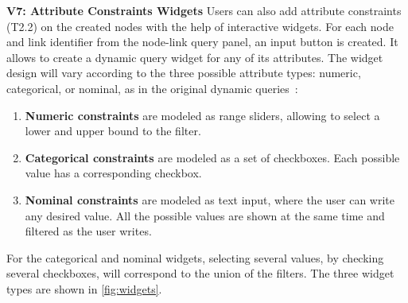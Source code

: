 \noindent\textbf{V7: Attribute Constraints Widgets}\label{sec:attributes}
Users can also add attribute constraints (T2.2) on the created nodes with the help of interactive widgets. For each node and link identifier from the node-link query panel, an input button is created. It allows to
create a dynamic query widget for any of its attributes.
The widget design will vary according to the three possible attribute types: numeric, categorical, or nominal, as in the original dynamic queries~\cite{DynamicQueries}:
\begin{enumerate}
    \item \textbf{Numeric constraints} are modeled as range sliders, allowing to select a lower and upper bound to the filter.
    \item \textbf{Categorical constraints} are modeled as a set of checkboxes. Each possible value has a corresponding checkbox.
    \item \textbf{Nominal constraints} are modeled as text input, where the user can write any desired value. All the possible values are shown at the same time and filtered as the user writes.
\end{enumerate}

For the categorical and nominal widgets, selecting several values, by checking several checkboxes, will correspond to the union of the filters.
The three widget types are shown in \autoref{fig:widgets}.

